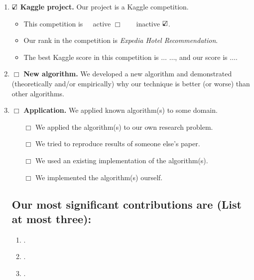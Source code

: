 \documentclass[12pt]{report}
\begin{document}
\begin{enumerate}

\item $\text{\rlap{$\checkmark$}}\square$ \textbf{Kaggle project.} Our project is a Kaggle competition.
\begin{itemize}
\item This competition is$~~~~~$ active $\Box$ $~~~~~~$ inactive $\text{\rlap{$\checkmark$}}\square$.
 \item Our rank in the competition is \textit{Expedia Hotel Recommendation}. 
\item  The best Kaggle score in this competition is $\dots$ $\dots$, and our score is $\dots$.
\end{itemize}





 \item $\Box$ \textbf{New algorithm.}  We developed a new algorithm and
 demonstrated (theoretically and/or empirically) why our technique
is better (or worse) than other algorithms.
\item $\Box$ \textbf{Application.}
We applied known algorithm(s) to some domain.
\begin{itemize}
\item [$\Box$] We applied the algorithm(s) to our own research
problem.
 \item [$\Box$] We tried to reproduce results of someone
else's paper.

\item [$\Box$] We used an existing implementation of the
algorithm(s).  \item [$\Box$] We implemented the algorithm(s)
ourself.
\end{itemize}

\subsection*{Our most significant contributions are (List at most three):}
\begin{enumerate}
\item .\\
\item .\\ 
\item .
\end{enumerate}

\end{enumerate}
\end{document}
